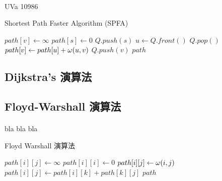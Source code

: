 \documentclass[12pt,a4paper,oneside]{report}
\begin{document}
\begin{CJK}{UTF8}{bkai}
\paragraph{}UVa 10986
\begin{algorithm}
\label{algo-spfa}
\caption{Shortest Path Faster Algorithm (SPFA)}
\begin{algorithmic}[1]
  \State{}
    \State $path[v]\gets\infty$
  \EndFor
  \State $path[s]\gets{0}$
  \State $Q.push(s)$
    \State $u\gets{Q.front()}$
    \State $Q.pop()$
        \State $path[v]\gets{path[u]+\omega{\ensuremath{({u},{v})}}}$
          \State $Q.push(v)$
        \EndIf
      \EndIf
    \EndFor
  \EndWhile
  \State \Return $path$
\EndProcedure
\end{algorithmic}
\end{algorithm}

\subsection{Dijkstra's 演算法}

\subsection{Floyd-Warshall 演算法}
\paragraph{}bla bla bla
\begin{algorithm}
\label{algo-floyd-warshall}
\caption{Floyd Warshall 演算法}
\begin{algorithmic}[1]
  \State{}
        \State $path[i][j]\gets{\infty}$
      \Else
        \State $path[i][i]\gets{0}$
      \EndIf
    \EndFor
  \EndFor
    \State $path[i][j]\gets{\omega{\ensuremath{({i},{j})}}}$
  \EndFor
          \State $path[i][j]\gets{path[i][k]+path[k][j]}$
        \EndIf
      \EndFor
    \EndFor
  \EndFor
  \State \Return $path$
\EndProcedure
\end{algorithmic}
\end{algorithm}


\end{CJK}
\end{document}
